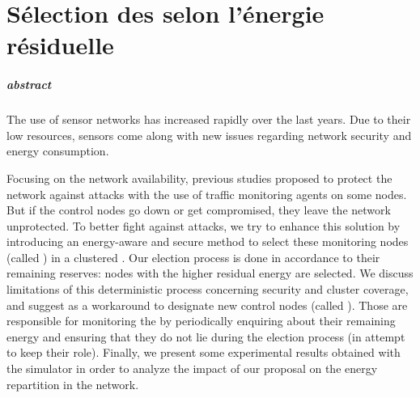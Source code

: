 \chapter{Sélection des \cns selon l'énergie résiduelle}\label{chap:se}

\renewcommand\chapterpath{Main/SelecEnergie}
\renewcommand\chapterfig{Main/SelecEnergie/Figures}

\paragraph{abstract}
The use of sensor networks has increased rapidly over the last years.
Due to their low resources, sensors come along with new issues regarding network security and energy consumption.

Focusing on the network availability, previous studies proposed to protect the network against \dos attacks with the use of traffic monitoring agents on some nodes.
But if the control nodes go down or get compromised, they leave the network unprotected.
To better fight against attacks, we try to enhance this solution by introducing an energy-aware and secure method to select these monitoring nodes (called \cns) in a clustered \wsn.
Our election process is done in accordance to their remaining reserves: nodes with the higher residual energy are selected.
We discuss limitations of this deterministic process concerning security and cluster coverage, and suggest as a workaround to designate new control nodes (called \vns).
Those \vns are responsible for monitoring the \cns by periodically enquiring about their remaining energy and ensuring that they do not lie during the election process (in attempt to keep their \cn role).
Finally, we present some experimental results obtained with the \nsiii simulator in order to analyze the impact of our proposal on the energy repartition in the network.








